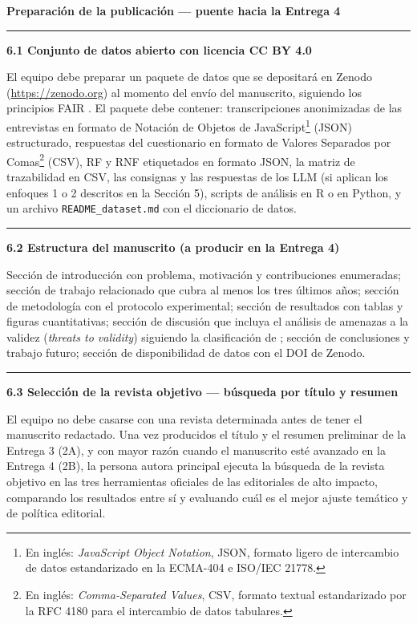 \documentclass[11pt,a4paper]{article}
\newcounter{secc}
\newcommand{\secband}[1]{%
    \stepcounter{secc}\par\vspace{9pt}\noindent
    {\setlength{\fboxsep}{0pt}%
        \colorbox{uteqgold}{\parbox[c][20pt][c]{0.05\textwidth}{\centering\textbf{\color{white}\small \arabic{secc}}}}%
        \colorbox{uteqgreen}{\parbox[c][20pt][c]{0.95\textwidth}{\hspace{8pt}\textbf{\color{white}\small #1}}}%
    }\par\vspace{5pt}}
\newcommand{\submark}[1]{\par\vspace{4pt}\noindent
    {\color{uteqgreen}\rule[-1pt]{3.5pt}{12pt}}\hspace{6pt}\textbf{\color{uteqgreen}#1}\par\vspace{2pt}}
\begin{document}
\secband{Preparación de la publicación --- puente hacia la Entrega 4}

\submark{6.1 Conjunto de datos abierto con licencia CC BY 4.0}
El equipo debe preparar un paquete de datos que se depositará en Zenodo (\url{https://zenodo.org}) al momento del envío del manuscrito, siguiendo los principios FAIR \cite{wilkinson2016fair}.
El paquete debe contener: transcripciones anonimizadas de las entrevistas en formato de Notación de Objetos de JavaScript\footnote{En inglés: \emph{JavaScript Object Notation}, JSON, formato ligero de intercambio de datos estandarizado en la ECMA-404 e ISO/IEC 21778.} (JSON) estructurado, respuestas del cuestionario en formato de Valores Separados por Comas\footnote{En inglés: \emph{Comma-Separated Values}, CSV, formato textual estandarizado por la RFC 4180 para el intercambio de datos tabulares.} (CSV), RF y RNF etiquetados en formato JSON, la matriz de trazabilidad en CSV, las consignas y las respuestas de los LLM (si aplican los enfoques 1 o 2 descritos en la Sección 5), scripts de análisis en R o en Python, y un archivo \texttt{README\_dataset.md} con el diccionario de datos.

\submark{6.2 Estructura del manuscrito (a producir en la Entrega 4)}
Sección de introducción con problema, motivación y contribuciones enumeradas; sección de trabajo relacionado que cubra al menos los tres últimos años; sección de metodología con el protocolo experimental; sección de resultados con tablas y figuras cuantitativas; sección de discusión que incluya el análisis de amenazas a la validez (\emph{threats to validity}) siguiendo la clasificación de \cite{wohlin2012experimentation}; sección de conclusiones y trabajo futuro; sección de disponibilidad de datos con el DOI de Zenodo.

\submark{6.3 Selección de la revista objetivo --- búsqueda por título y resumen}
El equipo no debe casarse con una revista determinada antes de tener el manuscrito redactado.
Una vez producidos el título y el resumen preliminar de la Entrega 3 (2A), y con mayor razón cuando el manuscrito esté avanzado en la Entrega 4 (2B), la persona autora principal ejecuta la búsqueda de la revista objetivo en las tres herramientas oficiales de las editoriales de alto impacto, comparando los resultados entre sí y evaluando cuál es el mejor ajuste temático y de política editorial.
\end{document}
